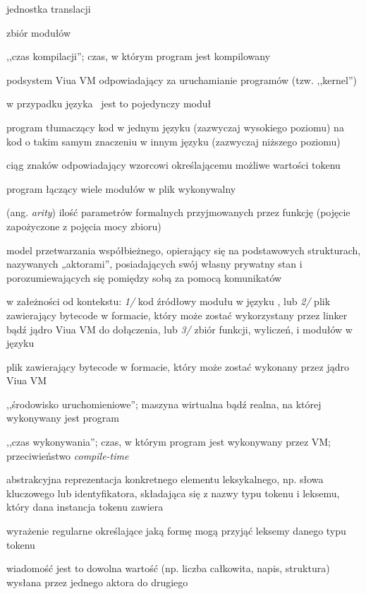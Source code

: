 \begin{labeling}{jednostka translacji}
    \item[biblioteka] zbiór modułów
    \item[\emph{compile-time}] ,,czas kompilacji''; czas, w którym program jest kompilowany
    \item[jądro] podsystem Viua VM odpowiadający za uruchamianie programów (tzw. ,,kernel'')
    \item[jednostka translacji] w przypadku języka \ViuAct\ jest to pojedynczy moduł
    \item[kompilator] program tłumaczący kod w jednym języku (zazwyczaj wysokiego poziomu) na kod o takim
        samym znaczeniu w innym języku (zazwyczaj niższego poziomu)
    \item[leksem] ciąg znaków odpowiadający wzorcowi określającemu możliwe wartości tokenu
    \item[linker] program łączący wiele modułów w plik wykonywalny
    \item[moc funkcji] (ang. \emph{arity}) ilość parametrów formalnych przyjmowanych przez funkcję (pojęcie
        zapożyczone z pojęcia mocy zbioru)
    \item [model aktorów] model przetwarzania współbieżnego, opierający się na
        podstawowych strukturach, nazywanych „aktorami”, posiadających swój
        własny prywatny stan i porozumiewających się pomiędzy sobą za pomocą
        komunikatów
    \item[moduł] w załeżności od kontekstu: \emph{1/} kod źródłowy modułu w języku \ViuAct, lub \emph{2/} plik
        zawierający bytecode w formacie, który może zostać wykorzystany przez linker bądź jądro Viua VM do
        dołączenia, lub \emph{3/} zbiór funkcji, wyliczeń, i modułów w języku \ViuAct
    \item[plik wykonywalny] plik zawierający bytecode w formacie, który może zostać wykonany przez jądro Viua
        VM
    \item[runtime] ,,środowisko uruchomieniowe''; maszyna wirtualna bądź realna, na której
        wykonywany jest program
    \item[\emph{run-time}] ,,czas wykonywania''; czas, w którym program jest wykonywany przez VM;
        przeciwieństwo \emph{compile-time}
    \item[token] abstrakcyjna reprezentacja konkretnego elementu leksykalnego, np. słowa kluczowego lub
        identyfikatora, składająca się z nazwy typu tokenu i leksemu, który dana instancja tokenu zawiera
    \item[wzorzec] wyrażenie regularne określające jaką formę mogą przyjąć leksemy danego typu tokenu
	\item[wiadomość] wiadomość jest to dowolna wartość (np. liczba całkowita,
		napis, struktura) wysłana przez jednego aktora do drugiego
\end{labeling}

